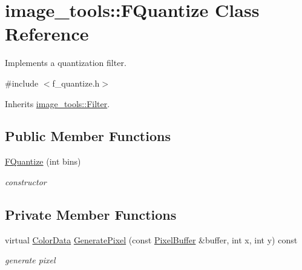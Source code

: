 \hypertarget{classimage__tools_1_1FQuantize}{}\section{image\+\_\+tools\+:\+:F\+Quantize Class Reference}
\label{classimage__tools_1_1FQuantize}


Implements a quantization filter.  




{\ttfamily \#include $<$f\+\_\+quantize.\+h$>$}



Inherits \hyperlink{classimage__tools_1_1Filter}{image\+\_\+tools\+::\+Filter}.

\subsection*{Public Member Functions}
\begin{DoxyCompactItemize}
\item 
\hyperlink{classimage__tools_1_1FQuantize_a449e80031ef13d39fc29c8d2a450a4bb}{F\+Quantize} (int bins)\hypertarget{classimage__tools_1_1FQuantize_a449e80031ef13d39fc29c8d2a450a4bb}{}\label{classimage__tools_1_1FQuantize_a449e80031ef13d39fc29c8d2a450a4bb}

\begin{DoxyCompactList}\small\item\em constructor \end{DoxyCompactList}\end{DoxyCompactItemize}
\subsection*{Private Member Functions}
\begin{DoxyCompactItemize}
\item 
virtual \hyperlink{classimage__tools_1_1ColorData}{Color\+Data} \hyperlink{classimage__tools_1_1FQuantize_a85066b63bff848dd4320501a3b79c7d6}{Generate\+Pixel} (const \hyperlink{classimage__tools_1_1PixelBuffer}{Pixel\+Buffer} \&buffer, int x, int y) const \hypertarget{classimage__tools_1_1FQuantize_a85066b63bff848dd4320501a3b79c7d6}{}\label{classimage__tools_1_1FQuantize_a85066b63bff848dd4320501a3b79c7d6}

\begin{DoxyCompactList}\small\item\em generate pixel \end{DoxyCompactList}\end{DoxyCompactItemize}

